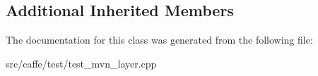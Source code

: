 \subsection*{Additional Inherited Members}


The documentation for this class was generated from the following file\+:\begin{DoxyCompactItemize}
\item 
src/caffe/test/test\+\_\+mvn\+\_\+layer.\+cpp\end{DoxyCompactItemize}
